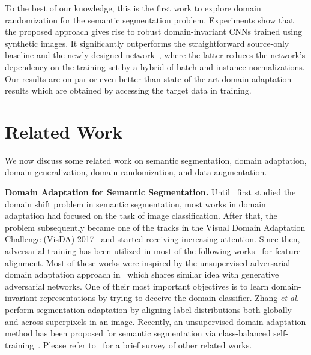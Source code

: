 \documentclass[10pt,twocolumn,letterpaper]{article}
\newcommand{\BG}[1]{\textcolor{blue}{BG: #1}}
\newcommand{\eat}[1]{}
\begin{document}
To the best of our knowledge, this is the first work to explore domain randomization for the semantic segmentation problem. Experiments show that the proposed approach gives rise to robust domain-invariant CNNs trained using synthetic images. It significantly outperforms the straightforward source-only baseline and the newly designed network~\cite{pan2018twoatonce}, where the latter reduces the network's dependency on the training set by a hybrid of batch and instance normalizations. Our results are on par or even better than state-of-the-art domain adaptation results which are obtained by accessing the target data in training. 

\section{Related Work}
We now discuss some related work on semantic segmentation, domain adaptation, domain generalization, domain randomization, and data augmentation.

\eat{\BG{Remember to discuss related works accepted to CVPR 2019 --- some of them have become available on ArXiv. Especially, discuss~\cite{rui2018dlow} because it has also considered a generalization setting.}}

\textbf{Domain Adaptation for Semantic Segmentation.}
Until~\cite{fcn_in_the_wild,zhang2017curriculum} first studied the domain shift problem in semantic segmentation, most works in domain adaptation had focused on the task of image classification. After that, the problem subsequently became one of the tracks in the Visual Domain Adaptation Challenge (VisDA) 2017~\cite{peng2017visda} and started receiving increasing attention. Since then, adversarial training has been utilized in most of the following works~\cite{Hoffman_cycada2017, chen2018road, sankaranarayanan2018learning, fcan} for feature alignment. Most of these works were inspired by the unsupervised adversarial domain adaptation approach in~\cite{ganin2015unsupervised} which shares similar idea with generative adversarial networks. One of their most important objectives is to learn domain-invariant representations by trying to deceive the domain classifier. 
Zhang \textit{et al.}~\cite{zhang2017curriculum} perform segmentation adaptation by aligning label distributions both globally and across superpixels in an image. Recently, an unsupervised domain adaptation method has been proposed for semantic segmentation via class-balanced self-training~\cite{eccv_unsupervised}. Please refer to~\cite[Section 5]{zhang2019curriculum} for a brief survey of other related works.
\end{document}
